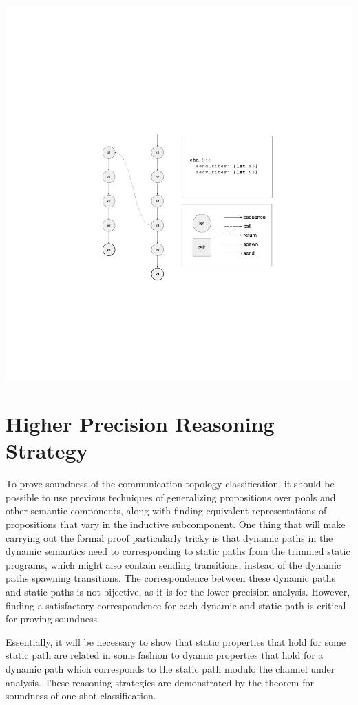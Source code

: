 \documentclass{article}
\begin{document}
\includegraphics[width=1.3\textwidth, left]{cml_graph_k4.pdf}

\section{Higher Precision Reasoning Strategy}
To prove soundness of the communication topology classification, it should be possible to use
previous techniques of generalizing propositions over pools and other semantic components,
along with finding equivalent representations of propositions that vary in the inductive
subcomponent. One thing that will make carrying out the formal proof particularly tricky is
that dynamic paths in the dynamic semantics need to corresponding to static paths from
the trimmed static programs, which might also contain sending transitions,
instead of the dynamic paths spawning transitions.
The correspondence between these dynamic paths and static paths
is not bijective, as it is for the lower precision analysis. However, finding a satisfactory
correspondence for each dynamic and static path is critical for proving soundness.

Essentially, it will be necessary to show that static
properties that hold for some static path are related in some fashion to dyamic properties
that hold for a dynamic path which corresponds to the static path modulo the channel under
analysis. These reasoning strategies are demonstrated by the theorem for soundness of
one-shot classification.
\end{document}
